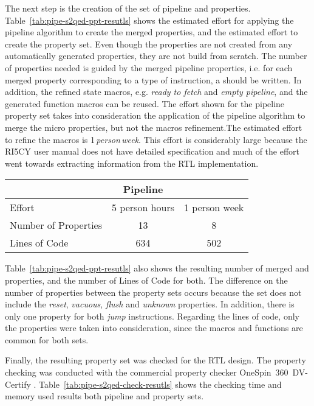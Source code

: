 The next step is the creation of the set of pipeline and \SSQED{} properties. Table~\ref{tab:pipe-s2qed-ppt-resutls} shows the estimated effort for applying the pipeline algorithm to create the merged properties, and the estimated effort to create the \SSQED{} property set. Even though the \SSQED{} properties are not created from any automatically generated properties, they are not build from scratch. The number of properties needed is guided by the merged pipeline properties, i.e. for each merged property corresponding to a type of instruction, a \SSQED{} should be written. In addition, the refined state macros, e.g. \textit{ready to fetch} and \textit{empty pipeline}, and the generated function macros can be reused. The effort shown for the pipeline property set takes into consideration the application of the pipeline algorithm to merge the micro properties, but not the macros refinement.The estimated effort to refine the macros is 1\,\textit{person\,week}. This effort is considerably large because the RI5CY user manual \cite{manual-ri5cy} does not have detailed specification and much of the effort went towards extracting information from the RTL implementation.

\begin{table*}[htb!] 
	\centering 
	\caption{Results comparison between the Pipeline and \SSQED{} properties sets.} 
	\label{tab:pipe-s2qed-ppt-resutls}
	\begin{tabular}{p{5cm} c c} 
		  &  \textbf{Pipeline} & \textbf{\SSQED{}} \\     
		\hline	
		Effort  &  5 person hours & 1 person week \\
		Number of Properties  &  13 & 8 \\
		Lines of Code  &  634 & 502 \\
	\end{tabular} 
\end{table*}

Table~\ref{tab:pipe-s2qed-ppt-resutls} also shows the resulting number of merged and \SSQED{} properties, and the number of Lines of Code for both. The difference on the number of properties between the property sets occurs because the \SSQED{} set does not include the \textit{reset}, \textit{vacuous}, \textit{flush} and \textit{unknown} properties. In addition, there is only one \SSQED{} property for both \textit{jump} instructions. Regarding the lines of code, only the properties were taken into consideration, since the macros and functions are common for both sets.

Finally, the resulting property set was checked for the RTL design. The property checking was conducted with the commercial property checker OneSpin~360~DV-Certify \texttrademark{}. Table~\ref{tab:pipe-s2qed-check-resutls} shows the checking time and memory used results both pipeline and \SSQED{} property sets.

